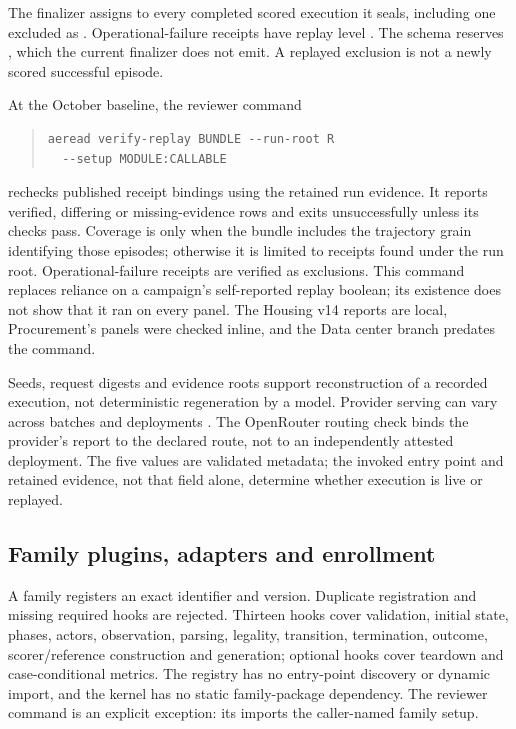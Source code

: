The finalizer assigns  to every completed scored
execution it seals, including one excluded as
. Operational-failure receipts have replay
level . The schema reserves , which the
current finalizer does not emit. A replayed exclusion is not a newly
scored successful episode.

\begin{samepage}
At the October baseline, the reviewer command
\begin{quote}\small
\begin{verbatim}
aeread verify-replay BUNDLE --run-root R
  --setup MODULE:CALLABLE
\end{verbatim}
\end{quote}
\end{samepage}
rechecks published receipt bindings using the retained run evidence.
It reports verified, differing or missing-evidence rows and exits
unsuccessfully unless its checks pass. Coverage is
 only when the bundle includes the
trajectory grain identifying those episodes; otherwise it is limited
to receipts found under the run root. Operational-failure receipts are
verified as exclusions. This command replaces reliance on a campaign's
self-reported replay boolean; its existence does not show that it ran
on every panel. The Housing v14 reports are local, Procurement's panels
were checked inline, and the Data center branch predates the command.

Seeds, request digests and evidence roots support reconstruction of a
recorded execution, not deterministic regeneration by a model.
Provider serving can vary across batches and deployments
\citep{he2025nondeterminism}. The OpenRouter routing check binds the
provider's report to the declared route, not to an independently
attested deployment. The five  values are
validated metadata; the invoked entry point and retained evidence,
not that field alone, determine whether execution is live or replayed.

\subsection{Family plugins, adapters and enrollment}
\label{app:runtime-families}

A family registers an exact identifier and version. Duplicate
registration and missing required hooks are rejected. Thirteen hooks
cover validation, initial state, phases, actors, observation, parsing,
legality, transition, termination, outcome, scorer/reference
construction and generation; optional hooks cover teardown and
case-conditional metrics. The registry has no entry-point discovery or
dynamic import, and the kernel has no static family-package dependency.
The reviewer command is an explicit exception: its
 imports the caller-named family setup.

